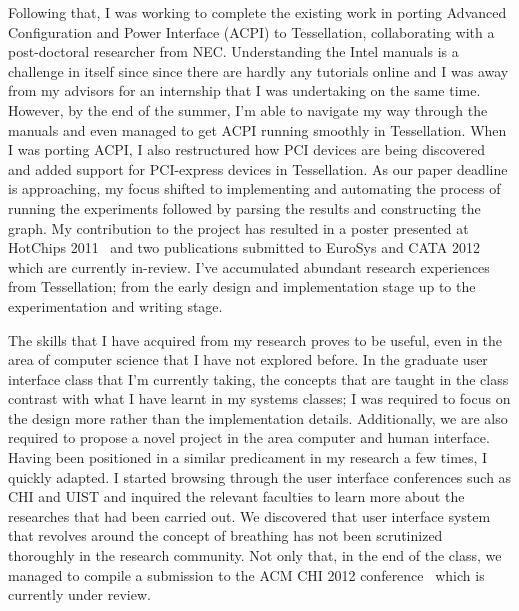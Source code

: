 \documentclass[12pt]{article}
\begin{document}
Following that, I was working to complete the existing work in porting Advanced Configuration and Power Interface (ACPI) to Tessellation, collaborating with a post-doctoral researcher from NEC. Understanding the Intel manuals is a challenge in itself since since there are hardly any tutorials online and I was away from my advisors for an internship that I was undertaking on the same time. However, by the end of the summer, I'm able to navigate my way through the manuals and even managed to get ACPI running smoothly in Tessellation. When I was porting ACPI, I also restructured how PCI devices are being discovered and added support for PCI-express devices in Tessellation. As our paper deadline is approaching, my focus shifted to implementing and automating the process of running the experiments followed by parsing the results and constructing the graph. My contribution to the project has resulted in a poster presented at HotChips 2011~\cite{tess_hotchip} and two publications submitted to EuroSys and CATA 2012~\cite{tess_eurosys, tess_cata} which are currently in-review. I've accumulated abundant research experiences from Tessellation; from the early design and implementation stage up to the experimentation and writing stage. \newline

The skills that I have acquired from my research proves to be useful, even in the area of computer science that I have not explored before. In the graduate user interface class that I'm currently taking, the concepts that are taught in the class contrast with what I have learnt in my systems classes; I was required to focus on the design more rather than the implementation details. Additionally, we are also required to propose a novel project in the area computer and human interface. Having been positioned in a similar predicament in my research a few times, I quickly adapted. I started browsing through the user interface conferences such as CHI and UIST and inquired the relevant faculties to learn more about the researches that had been carried out. We discovered that user interface system that revolves around the concept of breathing has not been scrutinized thoroughly in the research community. Not only that, in the end of the class, we managed to compile a submission to the ACM CHI 2012 conference~\cite{tube_chi} which is currently under review. \newline

\end{document}
